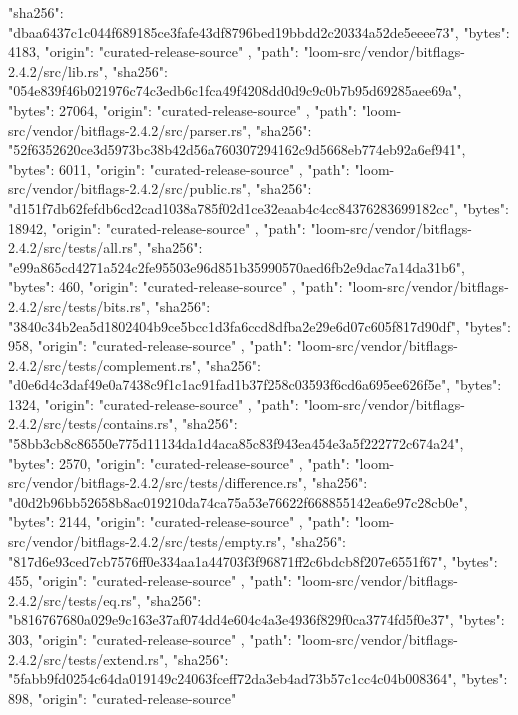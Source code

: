 {{      "sha256": "dbaa6437c1c044f689185ce3fafe43df8796bed19bbdd2c20334a52de5eeee73",
      "bytes": 4183,
      "origin": "curated-release-source"
    },
    {
      "path": "loom-src/vendor/bitflags-2.4.2/src/lib.rs",
      "sha256": "054e839f46b021976c74c3edb6c1fca49f4208dd0d9c9c0b7b95d69285aee69a",
      "bytes": 27064,
      "origin": "curated-release-source"
    },
    {
      "path": "loom-src/vendor/bitflags-2.4.2/src/parser.rs",
      "sha256": "52f6352620ce3d5973bc38b42d56a760307294162c9d5668eb774eb92a6ef941",
      "bytes": 6011,
      "origin": "curated-release-source"
    },
    {
      "path": "loom-src/vendor/bitflags-2.4.2/src/public.rs",
      "sha256": "d151f7db62fefdb6cd2cad1038a785f02d1ce32eaab4c4cc84376283699182cc",
      "bytes": 18942,
      "origin": "curated-release-source"
    },
    {
      "path": "loom-src/vendor/bitflags-2.4.2/src/tests/all.rs",
      "sha256": "e99a865cd4271a524c2fe95503e96d851b35990570aed6fb2e9dac7a14da31b6",
      "bytes": 460,
      "origin": "curated-release-source"
    },
    {
      "path": "loom-src/vendor/bitflags-2.4.2/src/tests/bits.rs",
      "sha256": "3840c34b2ea5d1802404b9ce5bcc1d3fa6ccd8dfba2e29e6d07c605f817d90df",
      "bytes": 958,
      "origin": "curated-release-source"
    },
    {
      "path": "loom-src/vendor/bitflags-2.4.2/src/tests/complement.rs",
      "sha256": "d0e6d4c3daf49e0a7438c9f1c1ac91fad1b37f258c03593f6cd6a695ee626f5e",
      "bytes": 1324,
      "origin": "curated-release-source"
    },
    {
      "path": "loom-src/vendor/bitflags-2.4.2/src/tests/contains.rs",
      "sha256": "58bb3cb8c86550e775d11134da1d4aca85c83f943ea454e3a5f222772c674a24",
      "bytes": 2570,
      "origin": "curated-release-source"
    },
    {
      "path": "loom-src/vendor/bitflags-2.4.2/src/tests/difference.rs",
      "sha256": "d0d2b96bb52658b8ac019210da74ca75a53e76622f668855142ea6e97c28cb0e",
      "bytes": 2144,
      "origin": "curated-release-source"
    },
    {
      "path": "loom-src/vendor/bitflags-2.4.2/src/tests/empty.rs",
      "sha256": "817d6e93ced7cb7576ff0e334aa1a44703f3f96871ff2c6bdcb8f207e6551f67",
      "bytes": 455,
      "origin": "curated-release-source"
    },
    {
      "path": "loom-src/vendor/bitflags-2.4.2/src/tests/eq.rs",
      "sha256": "b816767680a029e9c163e37af074dd4e604c4a3e4936f829f0ca3774fd5f0e37",
      "bytes": 303,
      "origin": "curated-release-source"
    },
    {
      "path": "loom-src/vendor/bitflags-2.4.2/src/tests/extend.rs",
      "sha256": "5fabb9fd0254c64da019149c24063fceff72da3eb4ad73b57c1cc4c04b008364",
      "bytes": 898,
      "origin": "curated-release-source"
}}
